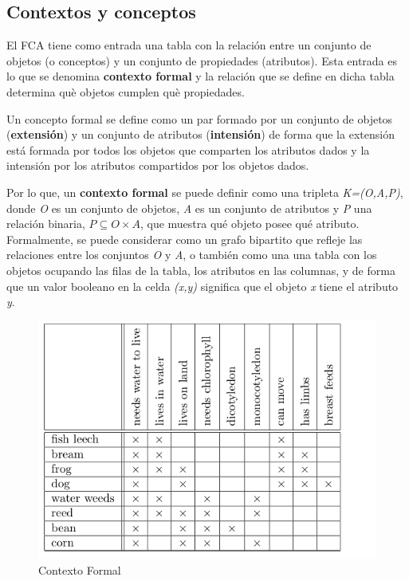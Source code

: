 \documentclass[12pt]{article}
\begin{document}
	\subsection{Contextos y conceptos}
		
		El FCA tiene como entrada una tabla con la relaci\'{o}n entre un conjunto de objetos (o conceptos) y 
		un conjunto de propiedades (atributos).  Esta entrada es lo que se  denomina \textbf{contexto 
		formal} y la relaci\'{o}n que se define en dicha tabla determina qu\`{e} objetos cumplen qu\`{e} propiedades.
		
		Un concepto formal se define como un par formado por  un conjunto de objetos (\textbf{extensi\'{o}n}) 
		y un conjunto de atributos (\textbf{intensi\'{o}n}) de forma que la extensi\'{o}n est\'{a} formada
		por todos los objetos que comparten los atributos dados y la intensi\'{o}n por los atributos 
		compartidos por los objetos dados.
		
		Por lo que, un \textbf{contexto formal} se puede definir como una tripleta \textit{K=(O,A,P)}, 
		donde \textit{O} es un conjunto de objetos, \textit{A} es un conjunto de atributos y \textit{P} 
		una relaci\'{o}n binaria, $P \subseteq O \times A$, que muestra qu\'{e} objeto posee qu\'{e} 
		atributo. Formalmente, se puede considerar como un grafo bipartito que refleje las relaciones 
		entre los conjuntos \textit{O} y \textit{A}, o tambi\'{e}n como una una tabla con los objetos 
		ocupando las filas de la tabla, los atributos en las columnas, y de forma que un valor booleano
		en la celda \textit{(x,y)} significa que el objeto \textit{x} tiene el atributo \textit{y}.\\
		
		\begin{figure}
			\begin{center}
				\includegraphics[scale=.5]{Figura1.png}
			\end{center}
			\caption{Contexto Formal}\label{Figura1}
		\end{figure}
		
\end{document}
